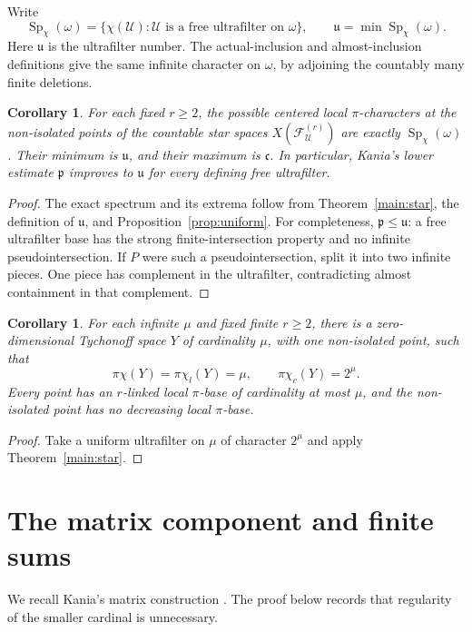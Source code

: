 \documentclass[11pt,a4paper]{amsart}
\newtheorem{corollary}[theorem]{Corollary}
\theoremstyle{definition}
\theoremstyle{remark}
\newcommand{\cont}{\mathfrak c}
\newcommand{\U}{\mathcal U}
\newcommand{\F}{\mathcal F}
\newcommand{\pc}{\pi\chi}
\newcommand{\pcl}{\pi\chi_l}
\newcommand{\pcc}{\pi\chi_c}
\begin{document}
Write
\[
\operatorname{Sp}_\chi(\omega)=
\{\chi(\U):\U\text{ is a free ultrafilter on }\omega\},
\qquad \mathfrak u=\min\operatorname{Sp}_\chi(\omega).
\]
Here $\mathfrak u$ is the ultrafilter number. The actual-inclusion and almost-inclusion definitions give the same infinite character on $\omega$, by adjoining the countably many finite deletions.

\begin{corollary}\label{cor:spectrum}
For each fixed $r\geqslant2$, the possible centered local $\pi$-characters at the non-isolated points of the countable star spaces $X(\F_\U^{(r)})$ are exactly $\operatorname{Sp}_\chi(\omega)$. Their minimum is $\mathfrak u$, and their maximum is $\cont$. In particular, Kania's lower estimate $\mathfrak p$ improves to $\mathfrak u$ for every defining free ultrafilter.
\end{corollary}
\begin{proof}
The exact spectrum and its extrema follow from Theorem~\ref{main:star}, the definition of $\mathfrak u$, and Proposition~\ref{prop:uniform}. For completeness, $\mathfrak p\leqslant\mathfrak u$: a free ultrafilter base has the strong finite-intersection property and no infinite pseudointersection. If $P$ were such a pseudointersection, split it into two infinite pieces. One piece has complement in the ultrafilter, contradicting almost containment in that complement.
\end{proof}

\begin{corollary}\label{cor:countable}
For each infinite $\mu$ and fixed finite $r\geqslant2$, there is a zero-dimensional Tychonoff space $Y$ of cardinality $\mu$, with one non-isolated point, such that
\[
\pc(Y)=\pcl(Y)=\mu,\qquad\pcc(Y)=2^\mu.
\]
Every point has an $r$-linked local $\pi$-base of cardinality at most $\mu$, and the non-isolated point has no decreasing local $\pi$-base.
\end{corollary}
\begin{proof}
Take a uniform ultrafilter on $\mu$ of character $2^\mu$ and apply Theorem~\ref{main:star}.
\end{proof}
\section{The matrix component and finite sums}

We recall Kania's matrix construction \cite[Section 4 and Remark 5.2]{Kania}. The proof below records that regularity of the smaller cardinal is unnecessary.
\end{document}
